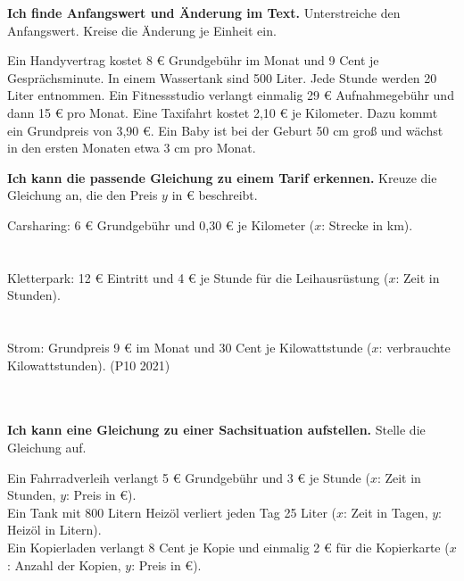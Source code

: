\setcounter{aufgabe}{40}
\hypertarget{e5}{}

\begin{aufgabe}{\textbf{Ich finde Anfangswert und Änderung im Text.} Unterstreiche den Anfangswert. Kreise die Änderung je Einheit ein.}
\begin{teile}
\teil Ein Handyvertrag kostet 8 € Grundgebühr im Monat und 9 Cent je Gesprächsminute.
\teil In einem Wassertank sind 500 Liter. Jede Stunde werden 20 Liter entnommen.
\teil Ein Fitnessstudio verlangt einmalig 29 € Aufnahmegebühr und dann 15 € pro Monat.
\teil Eine Taxifahrt kostet 2,10 € je Kilometer. Dazu kommt ein Grundpreis von 3,90 €.
\teil Ein Baby ist bei der Geburt 50 cm groß und wächst in den ersten Monaten etwa 3 cm pro Monat.
\end{teile}
\end{aufgabe}

\begin{aufgabe}{\textbf{Ich kann die passende Gleichung zu einem Tarif erkennen.} Kreuze die Gleichung an, die den Preis $y$ in € beschreibt.}
\begin{teile}
\teil Carsharing: 6 € Grundgebühr und 0,30 € je Kilometer ($x$: Strecke in km). \\
 \\  \\ 
\teil Kletterpark: 12 € Eintritt und 4 € je Stunde für die Leihausrüstung ($x$: Zeit in Stunden). \\
 \\  \\ 
\teil Strom: Grundpreis 9 € im Monat und 30 Cent je Kilowattstunde ($x$: verbrauchte Kilowattstunden). (P10 2021) \\
 \\  \\ 
\end{teile}
\end{aufgabe}

\begin{aufgabe}{\textbf{Ich kann eine Gleichung zu einer Sachsituation aufstellen.} Stelle die Gleichung auf.}
\begin{teile}
\teil Ein Fahrradverleih verlangt 5 € Grundgebühr und 3 € je Stunde ($x$: Zeit in Stunden, $y$: Preis in €). \\ 
\teil Ein Tank mit 800 Litern Heizöl verliert jeden Tag 25 Liter ($x$: Zeit in Tagen, $y$: Heizöl in Litern). \\ 
\teil Ein Kopierladen verlangt 8 Cent je Kopie und einmalig 2 € für die Kopierkarte ($x$: Anzahl der Kopien, $y$: Preis in €). \\ 
\end{teile}
\end{aufgabe}

